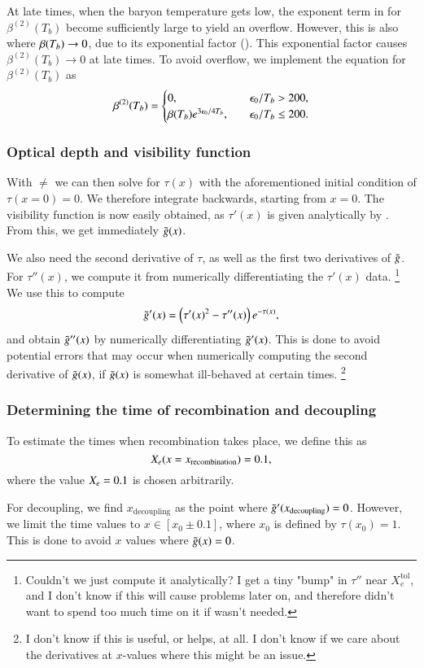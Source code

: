 At late times, when the baryon temperature gets low, the exponent term in  for $\beta^{(2)}(T_b)$ become sufficiently large to yield an overflow. However, this is also where $\beta(T_b)\to0$, due to its exponential factor (). This exponential factor causes $\beta^{(2)}(T_b)\to0$ at late times. To avoid overflow, we implement the equation for $\beta^{(2)}(T_b)$ as 
\begin{equation}
    \beta^{(2)}(T_b) = \begin{cases}
        0,\quad &\epsilon_0/T_b > 200, \\
        \beta(T_b) e^{3\epsilon_0/4T_b},\quad &\epsilon_0/T_b \leq 200.
    \end{cases}
\end{equation} 
 

\subsubsection{Optical depth and visibility function} \label{sssec:M2:implementations:optical_depth}
With $\ne$ we can then solve  for $\tau(x)$ with the aforementioned initial condition of $\tau(x=0)=0$. We therefore integrate backwards, starting from $x=0$. The visibility function is now easily obtained, as $\tau'(x)$ is given analytically by . From this, we get immediately $\tilde{g}(x)$. 

We also need the second derivative of $\tau$, as well as the first two derivatives of $\tilde{g}$. For $\tau''(x)$, we compute it from numerically differentiating the $\tau'(x)$ data. \footnote{Couldn't we just compute it analytically? I get a tiny "bump" in $\tau''$ near $X_e^\mathrm{tol}$, and I don't know if this will cause problems later on, and therefore didn't want to spend too much time on it if wasn't needed.} We use this to compute 
\begin{equation} \label{eq:M2:implementations:dg_dx}
    \tilde{g}'(x) = \left( \tau'(x)^2 - \tau''(x) \right) e^{-\tau(x)}, 
\end{equation}
and obtain $\tilde{g}''(x)$ by numerically differentiating $\tilde{g}'(x)$. This is done to avoid potential errors that may occur when numerically computing the second derivative of $\tilde{g}(x)$, if $\tilde{g}(x)$ is somewhat ill-behaved at certain times. \footnote{I don't know if this is useful, or helps, at all. I don't know if we care about the derivatives at $x$-values where this might be an issue.} 

\subsubsection{Determining the time of recombination and decoupling} \label{sssec:M2:implementations:determining_the_time_of_recombination_and_decoupling}
To estimate the times when recombination takes place, we define this as 
\begin{equation}
    X_e(x=x_\mathrm{recombination}) = 0.1,  
\end{equation}
where the value $X_e=0.1$ is chosen arbitrarily. 

For decoupling, we find $x_\mathrm{decoupling}$ as the point where $\tilde{g}'(x_\mathrm{decoupling})=0$. However, we limit the time values to $x\in[x_0\pm0.1]$, where $x_0$ is defined by $\tau(x_0)=1$. This is done to avoid $x$ values where $\tilde{g}(x)=0$. 